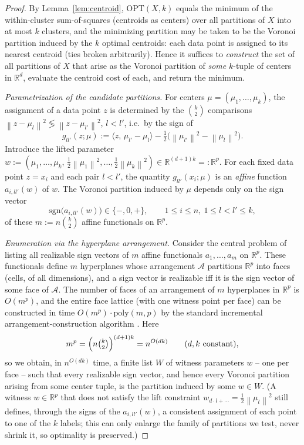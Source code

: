\documentclass{amsart}
\theoremstyle{plain}
\theoremstyle{definition}
\newcommand{\R}{\mathbb{R}}
\newcommand{\norm}[1]{\left\lVert #1 \right\rVert}
\begin{document}
\begin{proof}
By Lemma~\ref{lem:centroid}, $\mathrm{OPT}(X,k)$ equals the minimum of the
within-cluster sum-of-squares (centroids as centers) over all partitions of $X$
into at most $k$ clusters, and the minimizing partition may be taken to be the
Voronoi partition induced by the $k$ optimal centroids: each data point is
assigned to its nearest centroid (ties broken arbitrarily). Hence it suffices to
\emph{construct} the set of all partitions of $X$ that arise as the Voronoi
partition of \emph{some} $k$-tuple of centers in $\R^{d}$, evaluate the centroid
cost of each, and return the minimum.

\emph{Parametrization of the candidate partitions.} For centers
$\mu=(\mu_{1},\dots,\mu_{k})$, the assignment of a data point $z$ is determined by
the $\binom{k}{2}$ comparisons $\norm{z-\mu_{l}}^{2}\lessgtr\norm{z-\mu_{l'}}^{2}$,
$l<l'$, i.e.\ by the sign of
\[
g_{ll'}(z;\mu):=\langle z,\,\mu_{l'}-\mu_{l}\rangle
-\tfrac12\big(\norm{\mu_{l'}}^{2}-\norm{\mu_{l}}^{2}\big).
\]
Introduce the lifted parameter
$w:=(\mu_{1},\dots,\mu_{k},\,\tfrac12\norm{\mu_{1}}^{2},\dots,\tfrac12\norm{\mu_{k}}^{2})\in\R^{(d+1)k}=:\R^{p}$.
For each fixed data point $z=x_{i}$ and each pair $l<l'$, the quantity
$g_{ll'}(x_{i};\mu)$ is an \emph{affine} function $a_{i,ll'}(w)$ of $w$. The
Voronoi partition induced by $\mu$ depends only on the sign vector
\[
\mathrm{sgn}\big(a_{i,ll'}(w)\big)\in\{-,0,+\},
\qquad 1\le i\le n,\ 1\le l<l'\le k,
\]
of these $m:=n\binom{k}{2}$ affine functionals on $\R^{p}$.

\emph{Enumeration via the hyperplane arrangement.} Consider the central problem of
listing all realizable sign vectors of $m$ affine functionals
$a_{1},\dots,a_{m}$ on $\R^{p}$. These functionals define $m$ hyperplanes whose
arrangement $\mathcal A$ partitions $\R^{p}$ into faces (cells, of all
dimensions), and a sign vector is realizable iff it is the sign vector of some
face of $\mathcal A$. The number of faces of an arrangement of $m$ hyperplanes in
$\R^{p}$ is $O(m^{p})$, and the entire face lattice (with one witness point per
face) can be constructed in time $O(m^{p})\cdot\mathrm{poly}(m,p)$ by the standard
incremental arrangement-construction algorithm \cite{EOS}. Here
\[
m^{p}=\Big(n\tbinom{k}{2}\Big)^{(d+1)k}=n^{O(dk)}\qquad(d,k\ \text{constant}),
\]
so we obtain, in $n^{O(dk)}$ time, a finite list $W$ of witness parameters $w$ --
one per face -- such that every realizable sign vector, and hence every Voronoi
partition arising from some center tuple, is the partition induced by some
$w\in W$. (A witness $w\in\R^{p}$ that does not satisfy the lift constraint
$w_{d\cdot l+\cdots}=\tfrac12\norm{\mu_{l}}^{2}$ still defines, through the signs
of the $a_{i,ll'}(w)$, a consistent assignment of each point to one of the $k$
labels; this can only enlarge the family of partitions we test, never shrink it,
so optimality is preserved.)


\end{proof}
\end{document}
